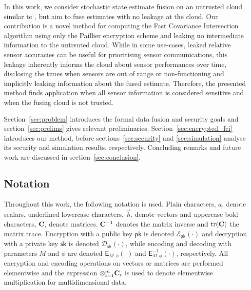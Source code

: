 \documentclass[letterpaper, 10 pt, conference]{ieeeconf}
\begin{document}
In this work, we consider stochastic state estimate fusion on an untrusted cloud similar to \cite{risticSecureFastCovariance2021}, but aim to fuse estimates with no leakage at the cloud. Our contribution is a novel method for computing the Fast Covariance Intersection algorithm using only the Paillier encryption scheme and leaking no intermediate information to the untrsuted cloud. While in some use-cases, leaked relative sensor accuracies can be useful for prioritising sensor communications, this leakage inherently informs the cloud about sensor performances over time, disclosing the times when sensors are out of range or non-functioning and implicitly leaking information about the fused estimate. Therefore, the presented method finds application when all sensor information is considered sensitive and when the fusing cloud is not trusted.

Section~\ref{sec:problem} introduces the formal data fusion and security goals and section~\ref{sec:prelims} gives relevant preliminaries. Section~\ref{sec:encrypted_fci} introduces our method, before sections~\ref{sec:security} and \ref{sec:simulation} analyse its security and simulation results, respectively. Concluding remarks and future work are discussed in section~\ref{sec:conclusion}.

\subsection{Notation}
Throughout this work, the following notation is used. Plain characters, $a$, denote scalars, underlined lowercase characters, $\vec{b}$, denote vectors and uppercase bold characters, ${{\mathbf{C}}}$, denote matrices. ${{\mathbf{C}}}^{-1}$ denotes the matrix inverse and $\operatorname{tr}({{\mathbf{C}}})$ the matrix trace. Encryption with a public key $\mathsf{pk}$ is denoted $\mathcal{E}_{\mathsf{pk}}(\cdot)$ and decryption with a private key $\mathsf{sk}$ is denoted $\mathcal{D}_{\mathsf{sk}}(\cdot)$, while encoding and decoding with parameters $M$ and $\phi$ are denoted $\mathsf{E}_{M,\phi}(\cdot)$ and $\mathsf{E}^{-1}_{M,\phi}(\cdot)$, respectively. All encryption and encoding operations on vectors or matrices are performed elementwise and the expression $\otimes_{i=1}^{m}{{\mathbf{C}}}_i$ is used to denote elementwise multiplication for multidimensional data.


% 
%                                              
%                                              
%                                              
% 
\end{document}
